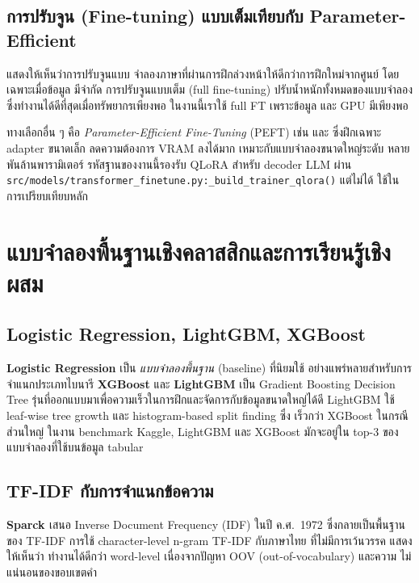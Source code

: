 \subsection{การปรับจูน (Fine-tuning) แบบเต็มเทียบกับ Parameter-Efficient}

\textbf{\textcite{howard2018ulmfit}} แสดงให้เห็นว่าการปรับจูนแบบ
จำลองภาษาที่ผ่านการฝึกล่วงหน้าให้ดีกว่าการฝึกใหม่จากศูนย์ โดยเฉพาะเมื่อข้อมูล
มีจำกัด การปรับจูนแบบเต็ม (full fine-tuning) ปรับน้ำหนักทั้งหมดของแบบจำลอง
ซึ่งทำงานได้ดีที่สุดเมื่อทรัพยากรเพียงพอ ในงานนี้เราใช้ full FT เพราะข้อมูล
และ GPU มีเพียงพอ

ทางเลือกอื่น ๆ คือ \emph{Parameter-Efficient Fine-Tuning} (PEFT) เช่น
\textcite{hu2022lora} และ \textcite{dettmers2023qlora} ซึ่งฝึกเฉพาะ
adapter ขนาดเล็ก ลดความต้องการ VRAM ลงได้มาก เหมาะกับแบบจำลองขนาดใหญ่ระดับ
หลายพันล้านพารามิเตอร์ รหัสฐานของงานนี้รองรับ QLoRA สำหรับ decoder LLM ผ่าน
\texttt{src/models/transformer\_finetune.py:\_build\_trainer\_qlora()} แต่ไม่ได้
ใช้ในการเปรียบเทียบหลัก

\section{แบบจำลองพื้นฐานเชิงคลาสสิกและการเรียนรู้เชิงผสม}
\label{sec:lit-classical}

\subsection{Logistic Regression, LightGBM, XGBoost}

\textbf{Logistic Regression} เป็น \emph{แบบจำลองพื้นฐาน} (baseline) ที่นิยมใช้
อย่างแพร่หลายสำหรับการจำแนกประเภทไบนารี \textbf{XGBoost} \cite{chen2016xgboost}
และ \textbf{LightGBM} \cite{ke2017lightgbm} เป็น Gradient Boosting Decision
Tree รุ่นที่ออกแบบมาเพื่อความเร็วในการฝึกและจัดการกับข้อมูลขนาดใหญ่ได้ดี
LightGBM ใช้ leaf-wise tree growth และ histogram-based split finding ซึ่ง
เร็วกว่า XGBoost ในกรณีส่วนใหญ่ ในงาน benchmark Kaggle, LightGBM และ XGBoost
มักจะอยู่ใน top-3 ของแบบจำลองที่ใช้บนข้อมูล tabular

\subsection{TF-IDF กับการจำแนกข้อความ}

\textbf{Sparck \textcite{sparckjones1972tfidf}} เสนอ Inverse Document
Frequency (IDF) ในปี ค.ศ.\ 1972 ซึ่งกลายเป็นพื้นฐานของ TF-IDF การใช้
character-level n-gram TF-IDF กับภาษาไทย ที่ไม่มีการเว้นวรรค แสดงให้เห็นว่า
ทำงานได้ดีกว่า word-level เนื่องจากปัญหา OOV (out-of-vocabulary) และความ
ไม่แน่นอนของขอบเขตคำ

